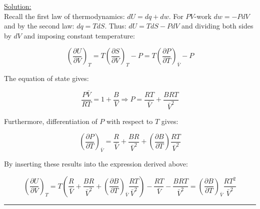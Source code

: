 \noindent
\underline{Solution:}\\

Recall the first law of thermodynamics: $dU = dq + dw$. For $PV$-work $dw = -PdV$ and by the second law: $dq = TdS$. Thus: $dU = TdS - PdV$ and dividing both sides by $dV$ and imposing constant temperature:

$$\left(\frac{\partial U}{\partial V}\right)_T = T\left(\frac{\partial S}{\partial V}\right)_T - P = T\left(\frac{\partial P}{\partial T}\right)_{\bar{V}} - P$$

The equation of state gives:

$$\frac{P\bar{V}}{RT} = 1 + \frac{B}{V}\Rightarrow P = \frac{RT}{\bar{V}} + \frac{BRT}{\bar{V}^2}$$

Furthermore, differentiation of $P$ with respect to $T$ gives:

$$\left(\frac{\partial P}{\partial T}\right)_{\bar{V}} = \frac{R}{\bar{V}} + \frac{BR}{\bar{V}^2} + \left(\frac{\partial B}{\partial T}\right)\frac{RT}{\bar{V}^2}$$

By inserting these results into the expression derived above:

$$\left(\frac{\partial U}{\partial V}\right)_T = T\left(\frac{R}{\bar{V}} + \frac{BR}{\bar{V}^2} + \left(\frac{\partial B}{\partial T}\right)_{\bar{V}}\frac{RT}{\bar{V}^2}\right) - \frac{RT}{\bar{V}} - \frac{BRT}{\bar{V}^2} = \left(\frac{\partial B}{\partial T}\right)_{\bar{V}}\frac{RT^2}{\bar{V}^2}$$

\hrule\vspace{0.5cm}

